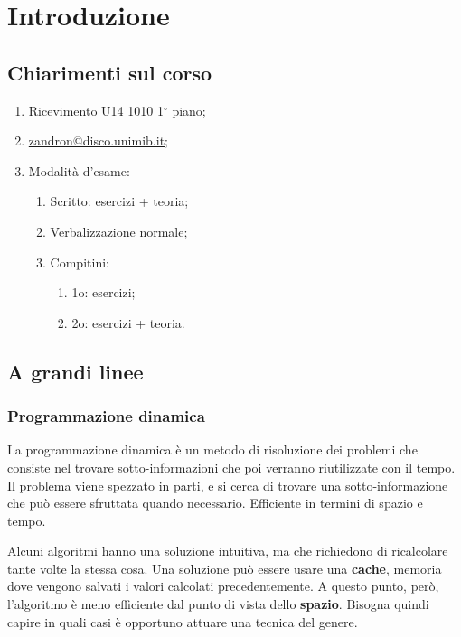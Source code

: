 \section{Introduzione}

\subsection{Chiarimenti sul corso}

\begin{enumerate}
    \item Ricevimento U14 1010 1$^\circ$ piano;
    \item \href{mailto:zandron@disco.unimib.it}{zandron@disco.unimib.it};
    \item Modalità d'esame: \begin{enumerate}
        \item Scritto: esercizi + teoria;
        \item Verbalizzazione normale;
        \item Compitini: \begin{enumerate}
            \item 1o: esercizi;
            \item 2o: esercizi + teoria.
        \end{enumerate}
    \end{enumerate}
\end{enumerate}

\subsection{A grandi linee}

\subsubsection{Programmazione dinamica}
La programmazione dinamica è un metodo di risoluzione dei problemi che consiste nel trovare sotto-informazioni che poi verranno riutilizzate con il tempo. Il problema viene spezzato in parti, e si cerca di trovare una sotto-informazione che può essere sfruttata quando necessario. Efficiente in termini di spazio e tempo. 

Alcuni algoritmi hanno una soluzione intuitiva, ma che richiedono di ricalcolare tante volte la stessa cosa. Una soluzione può essere usare una \textbf{cache}, memoria dove vengono salvati i valori calcolati precedentemente. A questo punto, però, l'algoritmo è meno efficiente dal punto di vista dello \textbf{spazio}. Bisogna quindi capire in quali casi è opportuno attuare una tecnica del genere. 

